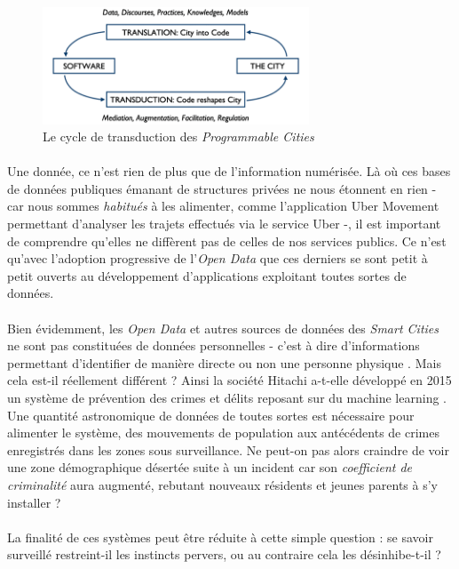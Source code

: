 \begin{figure}[h]
    \centering
    \includegraphics[width=300px]{chapters/01/images/programmable_city.png}
    \caption{\label{programmable_city} Le cycle de transduction des \emph{Programmable Cities}}
\end{figure}

\paragraph{} Une donnée, ce n'est rien de plus que de l'information numérisée. Là où ces bases de données publiques
émanant de structures privées ne nous étonnent en rien - car nous sommes \emph{habitués} à les alimenter, comme l'application
Uber Movement permettant d'analyser les trajets effectués via le service Uber -, il est important de comprendre
qu'elles ne diffèrent pas de celles de nos services publics. Ce n'est qu'avec l'adoption progressive de l'\emph{Open
Data} que ces derniers se sont petit à petit ouverts au développement d'applications exploitant toutes sortes de données. 

\paragraph{} Bien évidemment, les \emph{Open Data} et autres sources de données des \emph{Smart Cities} ne sont pas
constituées de données personnelles - c'est à dire d'informations permettant d'identifier de manière directe ou non une 
personne physique \cite{PersonalData0}. Mais cela est-il réellement différent ? Ainsi la société Hitachi a-t-elle développé
en 2015 un système de prévention des crimes et délits reposant sur du machine learning \cite{ProgrammableCity2}. Une quantité
astronomique de données de toutes sortes est nécessaire pour alimenter le système, des mouvements de population aux 
antécédents de crimes enregistrés dans les zones sous surveillance. Ne peut-on pas alors craindre de voir une zone 
démographique désertée suite à un incident car son \emph{coefficient de criminalité} aura augmenté, rebutant nouveaux
résidents et jeunes parents à s'y installer ?

\paragraph{} La finalité de ces systèmes peut être réduite à cette simple question : se savoir surveillé restreint-il
les instincts pervers, ou au contraire cela les désinhibe-t-il ?


